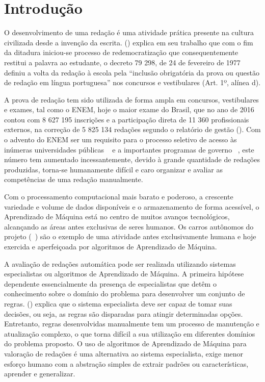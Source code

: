 \newpage
\section{Introdução}

O desenvolvimento de uma redação é uma atividade prática presente na 
cultura civilizada desde a invenção da escrita.  
(\citeyear{lara:1995}) explica em seu trabalho que com o fim da ditadura 
iniciou-se processo de redemocratização que consequentemente restitui a palavra 
ao estudante, o decreto 79 298, de 24 de fevereiro de 1977 definiu a volta da 
redação à escola pela ``inclusão obrigatória da prova ou questão de redação em 
língua portuguesa'' nos concursos e vestibulares (Art. 1º, alínea d).

A prova de redação tem sido utilizada de forma ampla em concursos, vestibulares 
e exames, tal como o ENEM, hoje o maior exame do Brasil, que no ano de 2016 
contou com 8 627 195 inscrições e a participação direta de 11 360 profissionais 
externos, na correção de 5 825 134 redações segundo o relatório de gestão 
\citeauthor{relatorio_de_gestao:2016} (\citeyear{relatorio_de_gestao:2016}). 
Com o advento do ENEM ser um requisito para o processo seletivo de acesso às 
inúmeras universidades públicas ~\cite{sisu:2017} e a importantes programas de 
governo ~\cite{csf:2017}, este número tem aumentado incessantemente, devido à 
grande quantidade de redações produzidas, torna-se humanamente difícil e caro 
organizar e avaliar as competências de uma redação manualmente.

Com o processamento computacional mais barato e poderoso, a crescente variedade 
e volume de dados disponíveis e o armazenamento de forma acessível, o 
Aprendizado de Máquina está no centro de muitos avanços tecnológicos, 
alcançando as áreas antes exclusivas de seres humanos. Os carros autônomos do
projeto \citeauthor{waymo:2017} (~\citeyear{waymo:2017}) são o exemplo de uma 
atividade antes exclusivamente humana e hoje exercida e aperfeiçoada por 
algoritmos de Aprendizado de Máquina. 

A avaliação de redações automática pode ser realizada utilizando sistemas
especialistas ou algoritmos de Aprendizado de Máquina. A primeira hipótese 
dependente essencialmente da presença de especialistas que detêm o 
conhecimento sobre o domínio do problema para desenvolver um conjunto de 
regras.  
(\citeyear{negnevitsky2005artificial}) explica que o sistema especialista deve 
ser capaz de tomar suas decisões, ou seja, as regras são disparadas para 
atingir determinadas opções. Entretanto, regras desenvolvidas manualmente 
tem um processo de manutenção e atualização complexo, o que torna difícil a sua 
utilização em diferentes domínios do problema proposto. O uso de algoritmos de 
Aprendizado de Máquina para valoração de redações é uma alternativa ao sistema 
especialista, exige menor esforço humano com a abstração simples de extrair 
padrões ou características, aprender e generalizar. 

